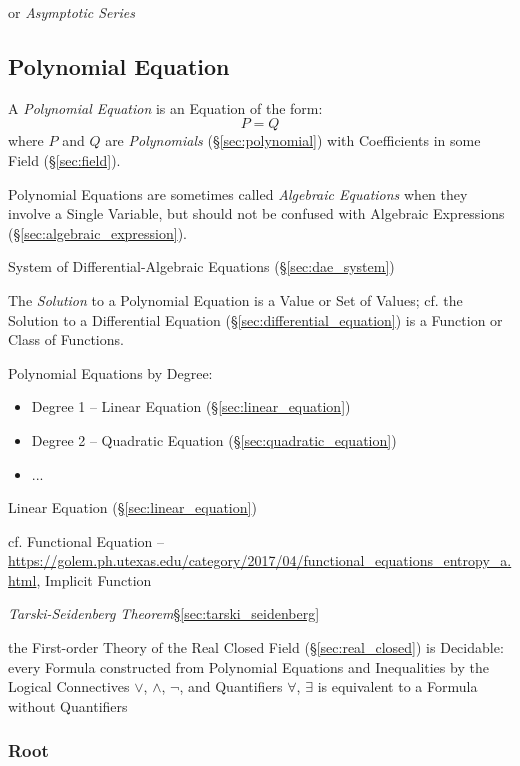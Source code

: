 or \emph{Asymptotic Series}



\subsection{Polynomial Equation}\label{sec:polynomial_equation}

A \emph{Polynomial Equation} is an Equation of the form:
\[
  P = Q
\]
where $P$ and $Q$ are \emph{Polynomials} (\S\ref{sec:polynomial}) with
Coefficients in some Field (\S\ref{sec:field}).

\fist Polynomial Equations are sometimes called \emph{Algebraic Equations} when
they involve a Single Variable, but should not be confused with Algebraic
Expressions (\S\ref{sec:algebraic_expression}).

\fist System of Differential-Algebraic Equations (\S\ref{sec:dae_system})

The \emph{Solution} to a Polynomial Equation is a Value or Set of Values; cf.
the Solution to a Differential Equation (\S\ref{sec:differential_equation}) is
a Function or Class of Functions.

Polynomial Equations by Degree:
\begin{itemize}
  \item Degree 1 -- Linear Equation (\S\ref{sec:linear_equation})
  \item Degree 2 -- Quadratic Equation (\S\ref{sec:quadratic_equation})
  \item ...
\end{itemize}

Linear Equation (\S\ref{sec:linear_equation})

cf. Functional Equation --
\url{https://golem.ph.utexas.edu/category/2017/04/functional_equations_entropy_a.html},
Implicit Function %


\emph{Tarski-Seidenberg Theorem}\S\ref{sec:tarski_seidenberg}

the First-order Theory of the Real Closed Field (\S\ref{sec:real_closed}) is
Decidable: every Formula constructed from Polynomial Equations and Inequalities
by the Logical Connectives $\vee$, $\wedge$, $\neg$, and Quantifiers $\forall$,
$\exists$ is equivalent to a Formula without Quantifiers



\subsubsection{Root}\label{sec:equation_root}

